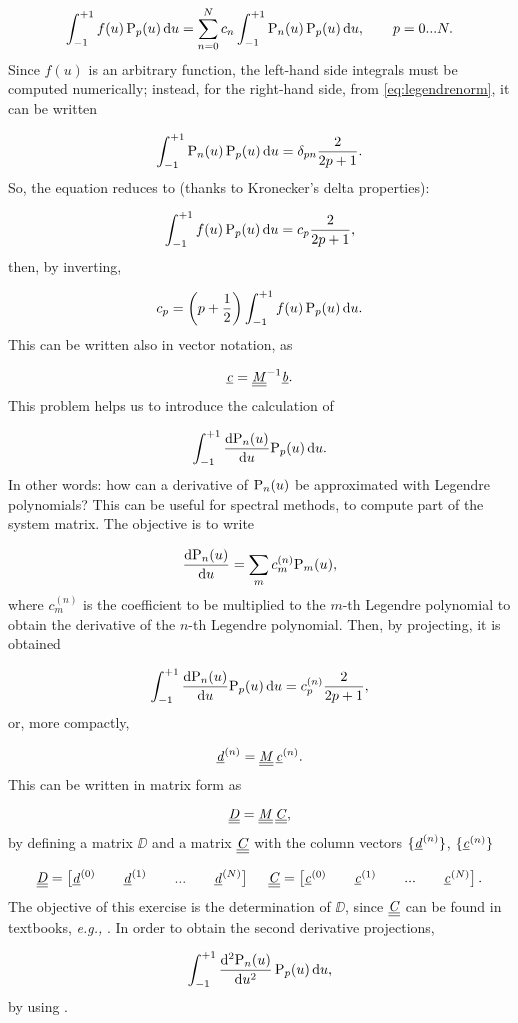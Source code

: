 \documentclass[a4paper,12pt]{article}
\begin{document}
\[
\int_{-1}^{+1} f(u) \, \mathrm{P}_p(u) \, \mathrm{d} u = \sum_{n=0}^N c_n \int_{-1}^{+1} \mathrm{P}_n(u) \, \mathrm{P}_p(u) \, \mathrm{d} u, ~~~~~~ p = 0...N.
\]
Since $f(u)$ is an arbitrary function, the left-hand side integrals must be computed numerically; instead, for the right-hand side, from \eqref{eq:legendrenorm}, it can be written

\[
\int_{-1}^{+1} \mathrm{P}_n(u) \, \mathrm{P}_p(u) \, \mathrm{d} u = \delta_{pn} \frac{2}{2p+1}.
\]
So, the equation reduces to (thanks to Kronecker's delta properties):

\[
\int_{-1}^{+1} f(u) \, \mathrm{P}_p(u) \, \mathrm{d} u = c_p \frac{2}{2p+1},
\]
then, by inverting,

\[
c_p = \left( p + \frac{1}{2} \right) \int_{-1}^{+1} f(u) \, \mathrm{P}_p(u) \, \mathrm{d} u.
\]
This can be written also in vector notation, as

\[
\underline{\mathit{c}} = \underline{\underline{\mathit{M}}}^{-1} \underline{\mathit{b}}.
\]
This problem helps us to introduce the calculation of

\[
\int_{-1}^{+1} \frac{\mathrm{d} \mathrm{P}_n(u)}{\mathrm{d} u} \mathrm{P}_p(u) \, \mathrm{d} u.
\]
In other words: how can a derivative of $\mathrm{P}_n(u)$ be approximated with Legendre polynomials? This can be useful for spectral methods, to compute part of the system matrix. The objective is to write

\[
\frac{\mathrm{d} \mathrm{P}_n(u)}{\mathrm{d} u} = \sum_m c_m^{(n)} \mathrm{P}_m(u),
\]
where $c_m^{(n)}$ is the coefficient to be multiplied to the $m$-th Legendre polynomial to obtain the derivative of the $n$-th Legendre polynomial. Then, by projecting, it is obtained

\[
\int_{-1}^{+1} \frac{\mathrm{d} \mathrm{P}_n(u)}{\mathrm{d} u} \mathrm{P}_p(u) \, \mathrm{d} u = c_p^{(n)} \frac{2}{2p + 1},
\]
or, more compactly,

\[
\underline{\mathit{d}}^{(n)} = \underline{\underline{\mathit{M}}} \, \underline{\mathit{c}}^{(n)}.
\]
This can be written in matrix form as

\[
\underline{\underline{\mathit{D}}} = \underline{\underline{\mathit{M}}} \, \underline{\underline{\mathit{C}}},
\]
by defining a matrix $\DD$ and a matrix $\underline{\underline{\mathit{C}}}$ with the column vectors $\{ \underline{\mathit{d}}^{(n)} \}$, $\{ \underline{\mathit{c}}^{(n)} \}$

\[
\underline{\underline{\mathit{D}}} = 
\begin{bmatrix}
\underline{\mathit{d}}^{(0)} & & \underline{\mathit{d}}^{(1)} & & ... & & \underline{\mathit{d}}^{(N)}
\end{bmatrix} ~~~~
\underline{\underline{\mathit{C}}} = 
\begin{bmatrix}
\underline{\mathit{c}}^{(0)} & & \underline{\mathit{c}}^{(1)} & & ... & & \underline{\mathit{c}}^{(N)}
\end{bmatrix}.
\]
The objective of this exercise is the determination of $\DD$, since $\underline{\underline{\mathit{C}}}$ can be found in textbooks, \textit{e.g.,} \cite[eq. (A.30)]{gottlieb}. In order to obtain the second derivative projections, 

\[
\int_{-1}^{+1} \frac{\mathrm{d}^2 \mathrm{P}_n(u)}{\mathrm{d} u^2} \, \mathrm{P}_p(u) \, \mathrm{d} u,
\]
by using \cite[eq. (A.31)]{gottlieb}.
\end{document}
